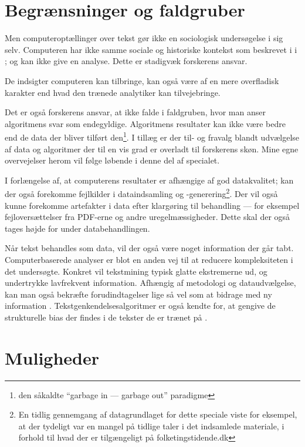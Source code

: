 \section{Begrænsninger og faldgruber}

Men computeroptællinger over tekst gør ikke en sociologisk undersøgelse i sig selv.
Computeren har ikke samme sociale og historiske kontekst som beskrevet i \citeauthor{juulDiskurserOmUngdom2013} i ; og kan ikke give en analyse.
Dette er stadigvæk forskerens ansvar.

De indsigter computeren kan tilbringe, kan også være af en mere overfladisk karakter end hvad den trænede analytiker kan tilvejebringe.

Det er også forskerens ansvar, at ikke falde i faldgruben, hvor man anser algoritmens svar som endegyldige.
Algoritmens resultater kan ikke være bedre end de data der bliver tilført den\footnote{den såkaldte “garbage in — garbage out” paradigme}.
I tillæg er der til- og fravalg blandt udvælgelse af data og algoritmer der til en vis grad er overladt til forskerens skøn.
Mine egne overvejelser herom vil følge løbende i denne del af specialet.

I forlængelse af, at computerens resultater er afhængige af god datakvalitet; kan der også forekomme fejlkilder i dataindsamling og -generering\footnote{
En tidlig gennemgang af datagrundlaget for dette speciale viste for eksempel, at der tydeligt var en mangel på tidlige taler i det indsamlede materiale, i forhold til hvad der er tilgængeligt på folketingstidende.dk}.
Der vil også kunne forekomme artefakter i data efter klargøring til behandling --- for eksempel fejloversættelser fra PDF-erne og andre uregelmæssigheder.
Dette skal der også tages højde for under databehandlingen.

Når tekst behandles som data, vil der også være noget information der går tabt.
Computerbaserede analyser er blot en anden vej til at reducere kompleksiteten i det undersøgte.
Konkret vil tekstmining typisk glatte ekstremerne ud, og undertrykke lavfrekvent information.
Afhængig af metodologi og dataudvælgelse, kan man også bekræfte forudindtagelser lige så vel som at bidrage med ny information \autocite[s. 15]{kwartlerTextMiningPractice2017}.
Tekstgenkendelsesalgoritmer er også kendte for, at gengive de strukturelle bias der findes i de tekster de er trænet på \autocite{kiritchenkoExaminingGenderRace2018}.

\section{Muligheder}

